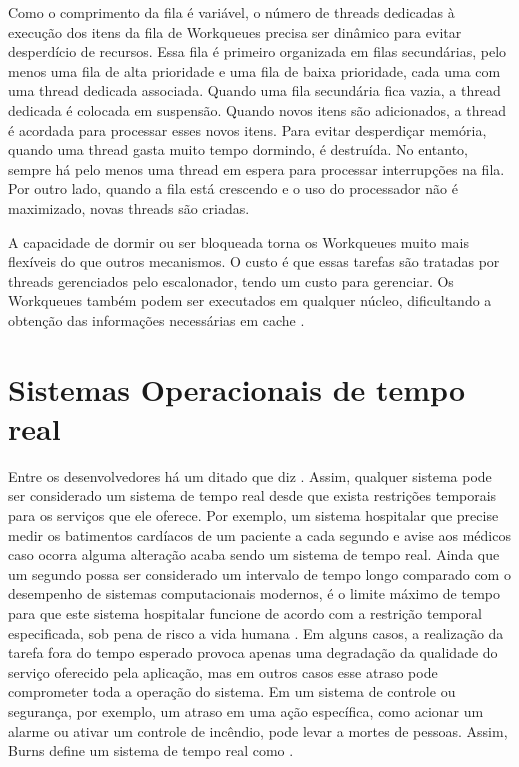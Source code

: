 Como o comprimento da fila é variável, o número de threads dedicadas à execução dos itens da fila de Workqueues precisa ser dinâmico para evitar desperdício de recursos. Essa fila é primeiro organizada em filas secundárias, pelo menos uma fila de alta prioridade e uma fila de baixa prioridade, cada uma com uma thread dedicada associada. Quando uma fila secundária fica vazia, a thread dedicada é colocada em suspensão. Quando novos itens são adicionados, a thread é acordada para processar esses novos itens. Para evitar desperdiçar memória, quando uma thread gasta muito tempo dormindo, é destruída. No entanto, sempre há pelo menos uma thread em espera para processar interrupções na fila. Por outro lado, quando a fila está crescendo e o uso do processador não é maximizado, novas threads são criadas.

A capacidade de dormir ou ser bloqueada torna os Workqueues muito mais flexíveis do que outros mecanismos. O custo é que essas tarefas são tratadas por threads gerenciados pelo escalonador, tendo um custo para gerenciar. Os Workqueues também podem ser executados em qualquer núcleo, dificultando a obtenção das informações necessárias em cache \cite{OReilly, Rothberg2015}.

\section{Sistemas Operacionais de tempo real}

Entre os desenvolvedores há um ditado que diz  \cite{LinuxFoundationRT}. Assim, qualquer sistema pode ser considerado um sistema de tempo real desde que exista restrições temporais para os serviços que ele oferece. Por exemplo, um sistema hospitalar que precise medir os batimentos cardíacos de um paciente a cada segundo e avise aos médicos caso ocorra alguma alteração acaba sendo um sistema de tempo real. Ainda que um segundo possa ser considerado um intervalo de tempo longo comparado com o desempenho de sistemas computacionais modernos, é o limite máximo de tempo para que este sistema hospitalar funcione de acordo com a restrição temporal especificada, sob pena de risco a vida humana \cite{Puhlmann2014}. Em alguns casos, a realização da tarefa fora do tempo esperado provoca apenas uma degradação da qualidade do serviço oferecido pela aplicação, mas em outros casos esse atraso pode comprometer toda a operação do sistema. Em um sistema de controle ou segurança, por exemplo, um atraso em uma ação específica, como acionar um alarme ou ativar um controle de incêndio, pode levar a mortes de pessoas. Assim, Burns define um sistema de tempo real como  \cite{Burns2001}.


